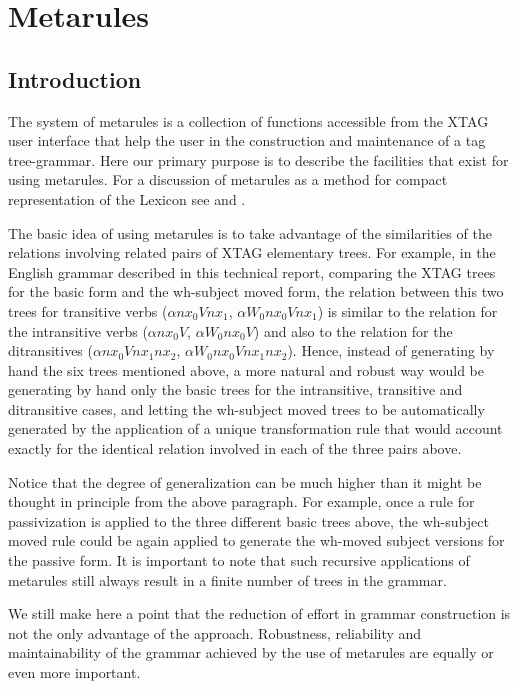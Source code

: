 \chapter{Metarules}
\label{metarules}

\section{Introduction}
\label{introduction}

The system of metarules is a collection of functions accessible from the XTAG
user interface that help the user in the construction and maintenance of a tag
tree-grammar.  Here our primary purpose is to describe the facilities that
exist for using metarules.  For a discussion of metarules as a method for
compact representation of the Lexicon see \cite{becker93} and \cite{srini94}.

The basic idea of using metarules is to take advantage of the similarities of
the relations involving related pairs of XTAG elementary trees.  For example,
in the English grammar described in this technical report, comparing the XTAG
trees for the basic form and the wh-subject moved form, the relation between
this two trees for transitive verbs ($\alpha nx_0Vnx_1$, $\alpha W_0nx_0Vnx_1$)
is similar to the relation for the intransitive verbs ($\alpha nx_0V$, $\alpha
W_0nx_0V$) and also to the relation for the ditransitives ($\alpha
nx_0Vnx_1nx_2$, $\alpha W_0nx_0Vnx_1nx_2$). Hence, instead of generating by
hand the six trees mentioned above, a more natural and robust way would be
generating by hand only the basic trees for the intransitive, transitive and
ditransitive cases, and letting the wh-subject moved trees to be automatically
generated by the application of a unique transformation rule that would account
exactly for the identical relation involved in each of the three pairs above.

Notice that the degree of generalization can be much higher than it might be
thought in principle from the above paragraph. For example, once a rule for
passivization is applied to the three different basic trees above, the 
wh-subject moved rule could be again applied to generate the wh-moved subject
versions for the passive form. It is important to note that such recursive
applications of metarules still always result in a finite number of trees in
the grammar.


We still make here a point that the reduction of effort in grammar construction
is not the only advantage of the approach. Robustness, 
reliability and maintainability of the grammar achieved by the use of  
metarules are equally or even more important.


